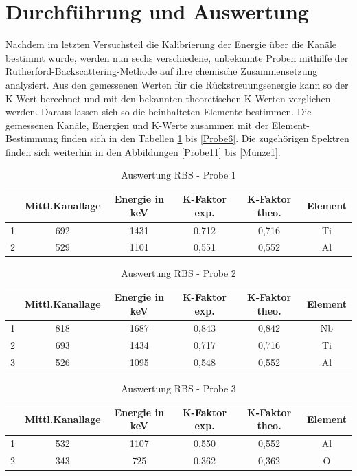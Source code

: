 \section{Durchführung und Auswertung}
Nachdem im letzten Versuchsteil die Kalibrierung der Energie über die Kanäle bestimmt wurde, werden nun sechs verschiedene, unbekannte Proben mithilfe der Rutherford-Backscattering-Methode auf ihre chemische Zusammensetzung analysiert. Aus den gemessenen Werten für die Rückstreuungsenergie kann so der K-Wert berechnet und mit den bekannten theoretischen K-Werten verglichen werden. Daraus lassen sich so die beinhalteten Elemente bestimmen. Die gemessenen Kanäle, Energien und K-Werte zusammen mit der Element-Bestimmung finden sich in den Tabellen \ref{Probe1} bis \ref{Probe6}. Die zugehörigen Spektren finden sich weiterhin in den Abbildungen \ref{Probe11} bis \ref{Münze1}. 

\begin{table}[h]
	\caption{Auswertung RBS - Probe 1}
	\begin{tabular}{|c|c|c|c|c|c|}
	\hline
	 & Mittl.Kanallage & Energie in keV & K-Faktor exp. & K-Faktor theo. & Element \\ \hline
	   1 & 692 & 1431 & 0,712 & 0,716 & Ti\\ \hline
	   2 & 529 & 1101 & 0,551 & 0,552 & Al \\ \hline
	\end{tabular}
\label{Probe1}
\end{table}

\begin{table}[h]
	\caption{Auswertung RBS - Probe 2}
	\begin{tabular}{|c|c|c|c|c|c|}
	\hline
	 & Mittl.Kanallage & Energie in keV & K-Faktor exp. & K-Faktor theo. & Element \\ \hline
	   1 & 818 & 1687 & 0,843 & 0,842 & Nb\\ \hline
	   2 & 693 & 1434 & 0,717 & 0,716 & Ti \\ \hline
	   3 & 526 & 1095 & 0,548 & 0,552 & Al \\ \hline
	\end{tabular}
\label{Probe2}
\end{table}

\begin{table}[h]
	\caption{Auswertung RBS - Probe 3}
	\begin{tabular}{|c|c|c|c|c|c|}
	\hline
	 & Mittl.Kanallage & Energie in keV & K-Faktor exp. & K-Faktor theo. & Element \\ \hline
	   1 & 532 & 1107 & 0,550 & 0,552 & Al\\ \hline
	   2 & 343 & 725 & 0,362 & 0,362 & O \\ \hline
	\end{tabular}
\label{Probe3}
\end{table}

